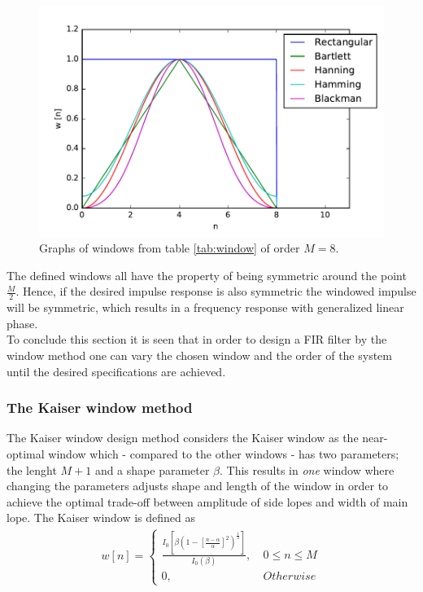 \begin{figure}[H]
    \centering
    \includegraphics[scale=0.8]{figures/filter_teori/window_types.pdf}
    \caption{Graphs of windows from table \ref{tab:window} of order $M = 8$.}
    \label{fig:window_types}
\end{figure}  

The defined windows all have the property of being symmetric around the point $\frac{M}{2}$. Hence, if the desired impulse response is also symmetric the windowed impulse will be symmetric, which results in a frequency response with generalized linear phase. \\
To conclude this section it is seen that in order to design a FIR filter by the window method one can vary the chosen window and the order of the system until the desired specifications are achieved.

\subsubsection{The Kaiser window method}
The Kaiser window design method considers the Kaiser window as the near-optimal window which -  compared to the other windows - has two parameters; the lenght $M+1$ and a shape parameter $\beta$. This results in \textit{one} window where changing the parameters adjusts shape and length of the window in order to achieve the optimal trade-off between amplitude of side lopes and width of main lope. The Kaiser window is defined as 
\begin{align}
w[n]=\left\{\begin{matrix}
 \frac{I_0[\beta (1-[\frac{n-\alpha}{\alpha}]^2)^{\frac{1}{2}}]}{I_0(\beta)} , &\ 0 \leq n \leq M  \\ 
0, &\ Otherwise
\end{matrix}\right.
\end{align}

